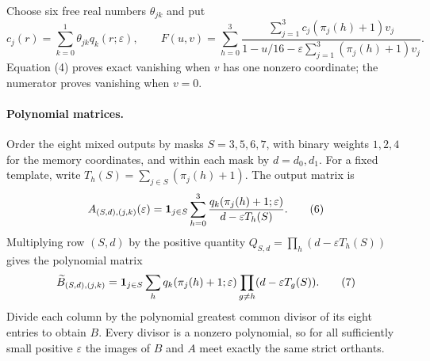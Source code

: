 \documentclass[11pt]{article}
\begin{document}
Choose six free real numbers $\theta_{jk}$ and put
\[
 c_j(r)=\sum_{k=0}^1\theta_{jk}q_k(r;\varepsilon),\qquad
 F(u,v)=\sum_{h=0}^3
 \frac{\sum_{j=1}^3c_j(\pi_j(h)+1)v_j}
 {1-u/16-\varepsilon\sum_{j=1}^3(\pi_j(h)+1)v_j}.
 \tag{5}
\]
Equation (4) proves exact vanishing when $v$ has one nonzero coordinate;
the numerator proves vanishing when $v=0$.

\paragraph{Polynomial matrices.}
Order the eight mixed outputs by masks $S=3,5,6,7$, with binary
weights $1,2,4$ for the memory coordinates, and within each mask by
$d=d_0,d_1$. For a fixed template, write
$T_h(S)=\sum_{j\in S}(\pi_j(h)+1)$. The output matrix is
\[
 A_{(S,d),(j,k)}(\varepsilon)=
 {\bf1}_{j\in S}\sum_{h=0}^3
 \frac{q_k(\pi_j(h)+1;\varepsilon)}{d-\varepsilon T_h(S)}.
 \tag{6}
\]
Multiplying row $(S,d)$ by the positive quantity
$Q_{S,d}=\prod_h(d-\varepsilon T_h(S))$ gives the polynomial matrix
\[
 \widetilde B_{(S,d),(j,k)}=
 {\bf1}_{j\in S}\sum_h q_k(\pi_j(h)+1;\varepsilon)
                 \prod_{g\ne h}(d-\varepsilon T_g(S)).
 \tag{7}
\]
Divide each column by the polynomial greatest common divisor of its
eight entries to obtain $B$. Every divisor is a nonzero polynomial,
so for all sufficiently small positive $\varepsilon$ the images of
$B$ and $A$ meet exactly the same strict orthants.
\end{document}
